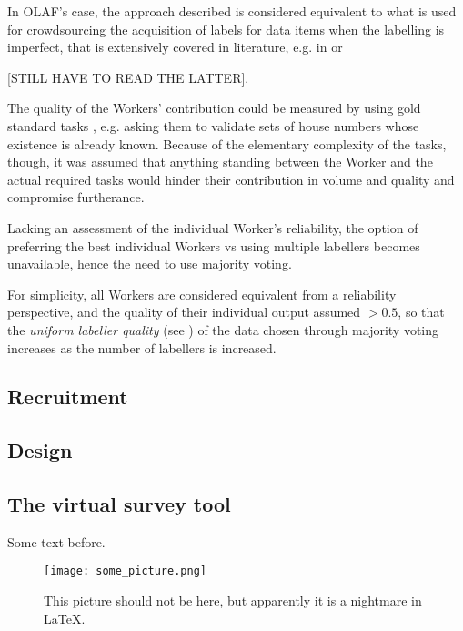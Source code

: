     In OLAF's case, the approach described is considered equivalent to what is used for crowdsourcing the acquisition of labels for data items when the labelling is imperfect, that is extensively covered in literature, e.g. in \cite{sheng2008get} or \cite{Welinder:2010vkb}{[STILL HAVE TO READ THE LATTER{]}. 
    
    The quality of the Workers' contribution could be measured by using gold standard tasks \cite{Oleson:2011tx}, e.g. asking them to validate sets of house numbers whose existence is already known. Because of the elementary complexity of the tasks, though, it was assumed that anything standing between the Worker and the actual required tasks would hinder their contribution in volume and quality and compromise furtherance.
    
    Lacking an assessment of the individual Worker's reliability, the option of preferring the best individual Workers vs using multiple labellers becomes unavailable, hence the need to use majority voting. 
    
    For simplicity, all Workers are considered equivalent from a reliability perspective, and the quality of their individual output assumed $ > 0.5 $, so that the \textit{uniform labeller quality} (see \cite{sheng2008get}) of the data chosen through majority voting increases as the number of labellers is increased.

\subsection{Recruitment}
\subsection{Design}
\subsection{The virtual survey tool}

    Some text before.
    
    \begin{figure*}
    	\texttt{[image: some\_picture.png]}
    	\caption{This picture should not be here, but apparently it is a nightmare in LaTeX.}
    	\label{fig:some_figure}
    \end{figure*}
    
    \paragraph{}
    
}
